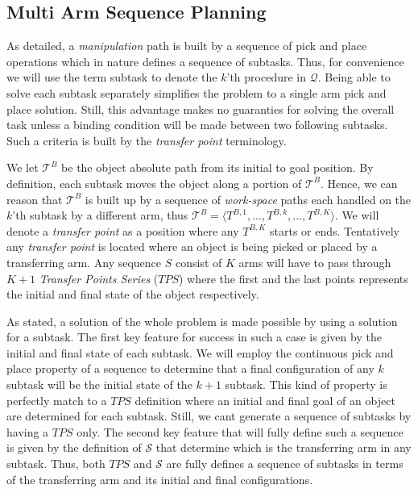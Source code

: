 \documentclass[english]{article}
\theoremstyle{definition}
\begin{document}
\subsection{Multi Arm Sequence Planning}
\label{section:high_level}
As detailed, a \textit{manipulation} path is built by a sequence of pick and place operations which in nature defines a sequence of subtasks. Thus, for convenience we will use the term subtask to denote the $k$'th procedure in $\mathcal{Q}$. Being able to solve each subtask separately simplifies the problem to a single arm pick and place solution. Still, this advantage makes no guaranties for solving the overall task unless a binding condition will be made between two following subtasks. Such a criteria is built by the \textit{transfer point} terminology.  

We let $\mathcal{T}^B$ be the object absolute path from its initial to goal position. By definition, each subtask moves the object along a portion of $\mathcal{T}^B$. Hence, we can reason that $\mathcal{T}^B$ is built up by a sequence of \textit{work-space} paths each handled on the $k$'th subtask by a different arm, thus $\mathcal{T}^B = \langle T^{B,1},...,T^{B,k},...,T^{B,K} \rangle $. We will denote a \textit{transfer point} as a position where any $T^{B,K}$ starts or ends. Tentatively any \textit{transfer point} is located where an object is being picked or placed by a transferring arm. Any sequence $S$ consist of $K$ arms will have to pass through $K+1$ \textit{Transfer Points Series} ($TPS$) where the first and the last points represents the initial and final state of the object respectively. 

As stated, a solution of the whole problem is made possible by using a solution for a subtask. The first key feature for success in such a case is given by the initial and final state of each subtask. We will employ the continuous pick and place property of a sequence to determine that a final configuration of any $k$ subtask will be the initial state of the $k+1$ subtask. This kind of property is perfectly match to a $TPS$ definition where an initial and final goal of an object are determined for each subtask. Still, we cant generate a sequence of subtasks by having a $TPS$ only. The second key feature that will fully define such a sequence is given by the definition of $\mathcal{S}$ that determine which is the transferring arm in any subtask. Thus, both $TPS$ and $\mathcal{S}$ are fully defines a sequence of subtasks in terms of the transferring arm and its initial and final configurations. 
\end{document}
